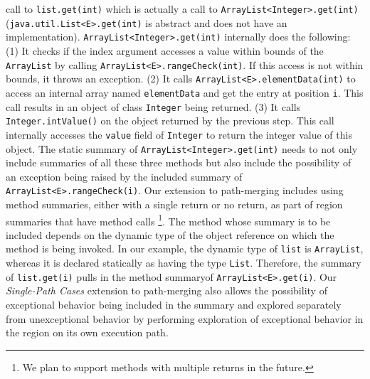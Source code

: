 call to {\tt list.get(int)} which is actually a call to {\tt ArrayList<Integer>.get(int)} ({\tt java.util.List<E>.get(int)} is abstract and does not have an implementation).
%
{\tt ArrayList<Integer>.get(int)} internally does the following:
%
(1) It checks if the index argument accesses a value within bounds of the {\tt ArrayList} by calling {\tt ArrayList<E>.rangeCheck(int)}. If this access is not within bounds, it throws an exception.
%
(2) It calls {\tt ArrayList<E>.elementData(int)} to access an internal array named {\tt elementData} and get the entry at position {\tt i}. This call results in an object of class {\tt Integer} being returned.
%
(3) It calls {\tt Integer.intValue()} on the object returned by the previous step. This call internally accesses the {\tt value} field of {\tt Integer} to return the integer value of this object.
%
The static summary of {\tt ArrayList<Integer>.get(int)} needs to not only include summaries of all these three methods but
also include the possibility of an exception being raised by the included summary of {\tt ArrayList<E>.rangeCheck(i)}.
%
Our extension to path-merging includes using method summaries, either with a single return or no return, as part of region summaries that have method calls \footnote{We plan to support methods with multiple returns in the future.}.
%
The method whose summary is to be included depends on the dynamic type of the object reference on which the method is being invoked.
%
In our example, the dynamic type of {\tt list} is {\tt ArrayList}, whereas it is declared statically as having the type {\tt List}.
%
Therefore, the summary of {\tt list.get(i)} pulls in the method summaryof {\tt ArrayList<E>.get(i)}.
%
Our \textit{Single-Path Cases} extension to path-merging also allows the possibility of exceptional behavior being
included in the summary and explored separately from unexceptional behavior by performing exploration of exceptional
behavior in the region on its own execution path.
%